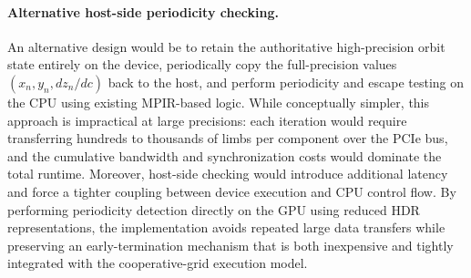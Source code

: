 \paragraph{Alternative host-side periodicity checking.}
An alternative design would be to retain the authoritative high-precision orbit
state entirely on the device, periodically copy the full-precision values
\((x_n, y_n, dz_n/dc)\) back to the host, and perform periodicity and escape
testing on the CPU using existing MPIR-based logic. While conceptually simpler,
this approach is impractical at large precisions: each iteration would require
transferring hundreds to thousands of limbs per component over the PCIe bus,
and the cumulative bandwidth and synchronization costs would dominate the total
runtime. Moreover, host-side checking would introduce additional latency and
force a tighter coupling between device execution and CPU control flow. By
performing periodicity detection directly on the GPU using reduced HDR
representations, the implementation avoids repeated large data transfers while
preserving an early-termination mechanism that is both inexpensive and tightly
integrated with the cooperative-grid execution model.



